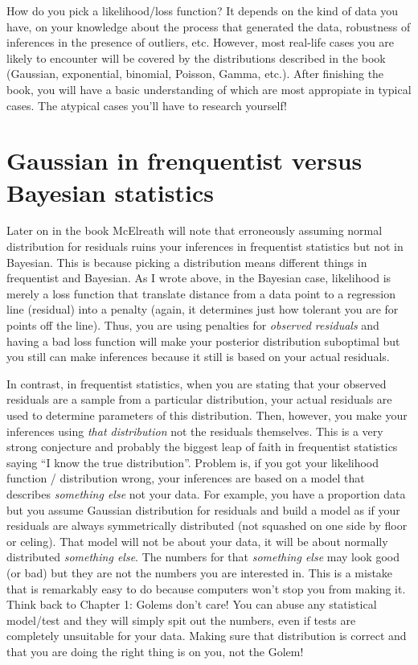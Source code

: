 \documentclass[
]{book}
\begin{document}
How do you pick a likelihood/loss function? It depends on the kind of data you have, on your knowledge about the process that generated the data, robustness of inferences in the presence of outliers, etc. However, most real-life cases you are likely to encounter will be covered by the distributions described in the book (Gaussian, exponential, binomial, Poisson, Gamma, etc.). After finishing the book, you will have a basic understanding of which are most appropiate in typical cases. The atypical cases you'll have to research yourself!

\hypertarget{gaussian-in-frenquentist-versus-bayesian-statistics}{%
\section{Gaussian in frenquentist versus Bayesian statistics}\label{gaussian-in-frenquentist-versus-bayesian-statistics}}

Later on in the book McElreath will note that erroneously assuming normal distribution for residuals ruins your inferences in frequentist statistics but not in Bayesian. This is because picking a distribution means different things in frequentist and Bayesian. As I wrote above, in the Bayesian case, likelihood is merely a loss function that translate distance from a data point to a regression line (residual) into a penalty (again, it determines just how tolerant you are for points off the line). Thus, you are using penalties for \emph{observed residuals} and having a bad loss function will make your posterior distribution suboptimal but you still can make inferences because it still is based on your actual residuals.

In contrast, in frequentist statistics, when you are stating that your observed residuals are a sample from a particular distribution, your actual residuals are used to determine parameters of this distribution. Then, however, you make your inferences using \emph{that distribution} not the residuals themselves. This is a very strong conjecture and probably the biggest leap of faith in frequentist statistics saying ``I know the true distribution''. Problem is, if you got your likelihood function / distribution wrong, your inferences are based on a model that describes \emph{something else} not your data. For example, you have a proportion data but you assume Gaussian distribution for residuals and build a model as if your residuals are always symmetrically distributed (not squashed on one side by floor or celing). That model will not be about your data, it will be about normally distributed \emph{something else}. The numbers for that \emph{something else} may look good (or bad) but they are not the numbers you are interested in. This is a mistake that is remarkably easy to do because computers won't stop you from making it. Think back to Chapter 1: Golems don't care! You can abuse any statistical model/test and they will simply spit out the numbers, even if tests are completely unsuitable for your data. Making sure that distribution is correct and that you are doing the right thing is on you, not the Golem!
\end{document}
